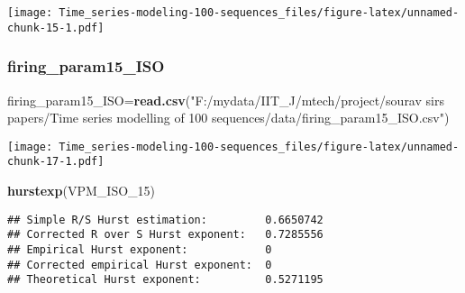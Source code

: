 \documentclass[
]{article}
\newenvironment{Shaded}{\begin{snugshade}}{\end{snugshade}}
\newcommand{\AttributeTok}[1]{\textcolor[rgb]{0.13,0.29,0.53}{#1}}
\newcommand{\DecValTok}[1]{\textcolor[rgb]{0.00,0.00,0.81}{#1}}
\newcommand{\FunctionTok}[1]{\textcolor[rgb]{0.13,0.29,0.53}{\textbf{#1}}}
\newcommand{\NormalTok}[1]{#1}
\newcommand{\OtherTok}[1]{\textcolor[rgb]{0.56,0.35,0.01}{#1}}
\newcommand{\SpecialCharTok}[1]{\textcolor[rgb]{0.81,0.36,0.00}{\textbf{#1}}}
\newcommand{\StringTok}[1]{\textcolor[rgb]{0.31,0.60,0.02}{#1}}
\begin{document}
\texttt{[image: Time\_series-modeling-100-sequences\_files/figure-latex/unnamed-chunk-15-1.pdf]}

\hypertarget{firing_param15_iso}{%
\subsubsection{firing\_param15\_ISO}\label{firing_param15_iso}}

\begin{Shaded}
\begin{Highlighting}[]
\NormalTok{firing\_param15\_ISO}\OtherTok{=}\FunctionTok{read.csv}\NormalTok{(}\StringTok{"F:/mydata/IIT\_J/mtech/project/sourav sirs papers/Time series modelling of 100 sequences/data/firing\_param15\_ISO.csv"}\NormalTok{)}
\end{Highlighting}
\end{Shaded}

\begin{Shaded}
\end{Shaded}

\texttt{[image: Time\_series-modeling-100-sequences\_files/figure-latex/unnamed-chunk-17-1.pdf]}

\begin{Shaded}
\begin{Highlighting}[]
\FunctionTok{hurstexp}\NormalTok{(VPM\_ISO\_15)}
\end{Highlighting}
\end{Shaded}

\begin{verbatim}
## Simple R/S Hurst estimation:         0.6650742 
## Corrected R over S Hurst exponent:   0.7285556 
## Empirical Hurst exponent:            0 
## Corrected empirical Hurst exponent:  0 
## Theoretical Hurst exponent:          0.5271195
\end{verbatim}
\end{document}
